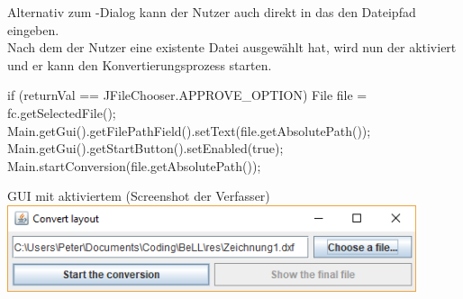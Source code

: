 Alternativ zum -Dialog kann der Nutzer auch direkt in das  den Dateipfad eingeben. \\
Nach dem der Nutzer eine existente Datei ausgewählt hat, wird nun der  aktiviert und er kann den Konvertierungsprozess starten.

\begin{code} 
if (returnVal == JFileChooser.APPROVE_OPTION) {
	File file = fc.getSelectedFile();
	Main.getGui().getFilePathField().setText(file.getAbsolutePath());
	Main.getGui().getStartButton().setEnabled(true);
	Main.startConversion(file.getAbsolutePath());
}
\end{code}
\begin{Bild}{GUI mit aktiviertem  (Screenshot der Verfasser)}
	\includegraphics[width = 120mm]{Bilder/GUI_2_InProgress}
\end{Bild}